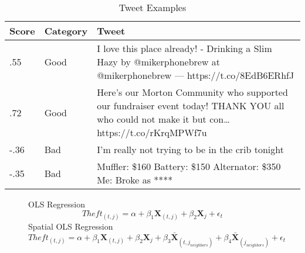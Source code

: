 \documentclass{article}
\begin{document}
\begin{table}
\begin{threeparttable}
\caption{Tweet Examples}
\begin{tabular}{ |p{1cm}|p{2cm}||p{12cm}|  }
 \hline
 \hline
Score & Category & Tweet\\
  \hline
 .55      &    Good      & I love this place already! - Drinking a Slim Hazy by @mikerphonebrew at @mikerphonebrew  — https://t.co/8EdB6ERhfJ
    \\
 \hline
 .72   &     Good      & Here's our Morton Community who supported our fundraiser event today! THANK YOU all who could not make it but con… https://t.co/rKrqMPWf7u    \\
 \hline
 -.36   &   Bad  & I'm really not trying to be in the crib tonight        \\
 \hline
 -.35   &   Bad  & Muffler: \$160 Battery: \$150 Alternator: \$350  Me: Broke as ****        \\
  \hline
\end{tabular}

    \end{threeparttable}
\end{table}
\clearpage



\begin{figure}
\centering
OLS Regression
\[ Theft_{(t,j)} = \alpha + \beta_1 \bm{X}_{(t,j)} + \beta_2 \bm{X}_{j} + \epsilon_t \]
Spatial OLS Regression\\ 
\[ Theft_{(t,j)} = \alpha + \beta_1 \bm{X}_{(t,j)} + \beta_2 \bm{X}_j + \beta_3 \bm{\bar{X}}_{(t,{j_{neighbors}})} + \beta_4 \bm{\bar{X}}_{(j_{neighbors})} + \epsilon_t \]
\end{figure}


\clearpage

\end{document}
